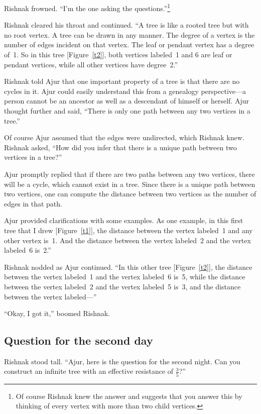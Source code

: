 Rishnak frowned. ``I'm the one asking the questions.''\footnote{Of course Rishnak knew the answer and suggests that you answer this by thinking of every vertex with more than two child vertices.}

Rishnak cleared his throat and continued. ``A tree is like a rooted tree but with no root vertex. A tree can be drawn in any manner. The degree of a vertex is the number of edges incident on that vertex. The leaf or pendant vertex has a degree of~1. So in this tree [Figure~\ref{t2}], both vertices labeled~1 and 6 are leaf or pendant vertices, while all other vertices have degree~2.''

Rishnak told Ajur that one important property of a tree is that there are no cycles in it. Ajur could easily understand this from a genealogy perspective---a person cannot be an ancestor as well as a descendant of himself or herself.
Ajur thought further and said, ``There is only one path between any two vertices in a tree.''

Of course Ajur assumed that the edges were undirected, which Rishnak knew. Rishnak asked, ``How did you infer that there is a unique path between two vertices in a tree?''

Ajur promptly replied that if there are two paths between any two vertices, there will be a cycle, which cannot exist in a tree. Since there is a unique path between two vertices, one can compute the distance between two vertices as the number of edges in that path.

Ajur provided clarifications with some examples. As one example, in this first tree that I drew [Figure~\ref{t1}], the distance between the vertex labeled~1 and any other vertex is~1. And the distance between the vertex labeled~2 and the vertex labeled~6 is~2.''

Rishnak nodded as Ajur continued. ``In this other tree [Figure~\ref{t2}], the distance between the vertex labeled~1 and the vertex labeled~6 is~5, while the distance between the vertex labeled~2 and the vertex labeled~5 is~3, and the distance between the vertex labeled---''

``Okay, I got it,'' boomed Rishnak.

\subsection*{Question for the second day}
Rishnak stood tall. ``Ajur, here is the question for the second night. Can you construct an infinite tree with an effective resistance of $\frac{3}{5}$?''

